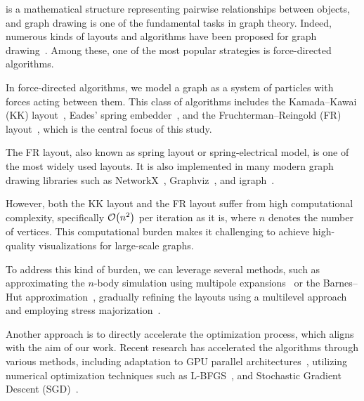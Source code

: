 \documentclass[dvipdfmx,journal]{IEEEtran}
\begin{document}
 is a mathematical structure representing pairwise relationships between objects, and graph drawing is one of the fundamental tasks in graph theory.
Indeed, numerous kinds of layouts and algorithms have been proposed for graph drawing~\cite{tutteHowDrawGraph1963,chrobakLineartimeAlgorithmDrawing1995,sugiyamaMethodsVisualUnderstanding1981,ghassemitoosiSimulatedAnnealingPreProcessing2016}.
Among these, one of the most popular strategies is force-directed algorithms.

In force-directed algorithms, we model a graph as a system of particles with forces acting between them.
This class of algorithms includes the Kamada--Kawai (KK) layout~\cite{kamadaAlgorithmDrawingGeneral1989},
Eades' spring embedder~\cite{eades1984heuristic}, and the Fruchterman--Reingold (FR) layout~\cite{fruchtermanGraphDrawingForcedirected1991,kobourovSpringEmbeddersForce2012}, which is the central focus of this study.

The FR layout, also known as spring layout or spring-electrical model, is one of the most widely used layouts.
It is also implemented in many modern graph drawing libraries such as NetworkX~\cite{hagberg2008exploring}, Graphviz~\cite{ellsonGraphvizOpenSource2002}, and igraph~\cite{csardiIgraphSoftwarePackage2006}.

However, both the KK layout and the FR layout suffer from high computational complexity, specifically $\order{n^2}$ per iteration as it is, where $n$ denotes the number of vertices.
This computational burden makes it challenging to achieve high-quality visualizations for large-scale graphs.

To address this kind of burden, we can leverage several methods, such as approximating the $n$-body simulation using multipole expansions~\cite{greengardFastAlgorithmParticle1987} or the Barnes--Hut approximation~\cite{barnesHierarchicalLogForcecalculation1986}, gradually refining the layouts using a multilevel approach~\cite{Hu2006EfficientHF} and employing stress majorization~\cite{gansnerGraphDrawingStress2005}.

Another approach is to directly accelerate the optimization process, which aligns with the aim of our work.
Recent research has accelerated the algorithms through various methods, including adaptation to GPU parallel architectures~\cite{gajdosParallelFruchtermanReingold2016}, utilizing numerical optimization techniques such as L-BFGS~\cite{6183577}, and Stochastic Gradient Descent (SGD)~\cite{8419285}.
\end{document}
